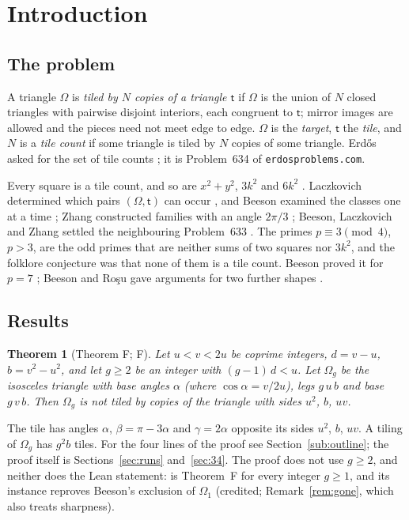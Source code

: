 \documentclass[11pt,reqno]{amsart}
\theoremstyle{plain}
\newtheorem{theorem}{Theorem}[section]
\theoremstyle{definition}
\newcommand{\sF}{\textup{\textsf{F}}}
\begin{document}
\maketitle

\section{Introduction}\label{sec:intro}

\subsection{The problem}
A triangle $\Omega$ is \emph{tiled by $N$ copies of a triangle $\mathsf t$} if $\Omega$ is the union of $N$ closed triangles
with pairwise disjoint interiors, each congruent to $\mathsf t$; mirror images are allowed and the pieces need not meet edge to edge.
$\Omega$ is the \emph{target}, $\mathsf t$ the \emph{tile}, and $N$ is a \emph{tile count} if some triangle is tiled by $N$ copies of some
triangle. Erd\H{o}s asked for the set of tile counts \cite{Soifer}; it is Problem~634 of \texttt{erdosproblems.com}.

Every square is a tile count, and so are $x^2+y^2$, $3k^2$ and $6k^2$ \cite{Soifer}. Laczkovich determined which pairs
$(\Omega,\mathsf t)$ can occur \cite{Laczkovich1995,Laczkovich2012}, and Beeson examined the classes one at a time
\cite{BeesonI,BeesonIII,BeesonIso,BeesonSeven,BeesonEq}; Zhang constructed families with an angle $2\pi/3$ \cite{Zhang};
Beeson, Laczkovich and Zhang settled the neighbouring Problem~633 \cite{Erdos633}. The primes $p\equiv3\pmod4$, $p>3$, are the odd
primes that are neither sums of two squares nor $3k^2$, and the folklore conjecture was that none of them is a tile count. Beeson
proved it for $p=7$ \cite{BeesonSeven}; Beeson and Ro\c{s}u gave arguments for two further shapes \cite{BeesonRosu}.

\subsection{Results}\label{sub:intro-results}
\begin{theorem}[Theorem F; \sF]\label{thm:F-intro}
Let $u<v<2u$ be coprime integers, $d=v-u$, $b=v^2-u^2$, and let $g\ge2$ be an integer with $(g-1)\,d<u$. Let $\Omega_{g}$ be the isosceles triangle with base angles $\alpha$ (where $\cos\alpha=v/2u$), legs $g\,u\,b$ and base $g\,v\,b$. Then $\Omega_{g}$ is not tiled by copies of the triangle with sides $u^2$, $b$, $uv$.
\end{theorem}
The tile has angles $\alpha$, $\beta=\pi-3\alpha$ and $\gamma=2\alpha$ opposite its sides $u^2$, $b$, $uv$. A tiling of $\Omega_{g}$ has $g^2b$ tiles.
For the four lines of the proof see Section~\ref{sub:outline}; the proof itself is Sections~\ref{sec:runs} and~\ref{sec:34}. The proof does not use $g\ge2$, and neither does the Lean statement:  is Theorem~F for every integer $g\ge1$, and its instance  reproves Beeson's exclusion of $\Omega_{1}$ (credited; Remark~\ref{rem:gone}, which also treats sharpness).
\end{document}
